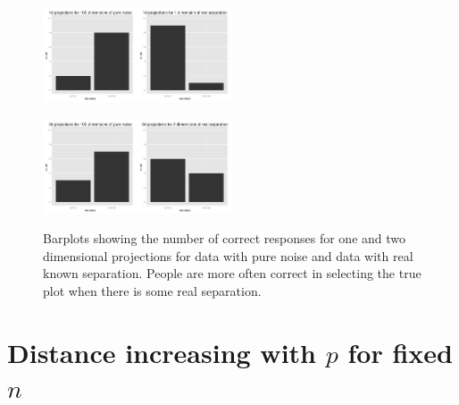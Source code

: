 \documentclass[12]{report}
\begin{document}
\begin{figure}[hbtp]
       \centerline{\includegraphics[width=0.25\textwidth]{result_1d_noise.pdf}\includegraphics[width=0.25\textwidth]{result_1d_sep.pdf}}
       \centerline{\includegraphics[width=0.25\textwidth]{result_2d_noise.pdf}\includegraphics[width=0.25\textwidth]{result_2d_sep.pdf}}
       \caption{Barplots showing the number of correct responses for one and two dimensional projections for data with pure noise and data with real known separation. People are more often correct in selecting the true plot when there is some real separation.  }
       \label{fig:result}
\end{figure}








\section{Distance increasing with $p$ for fixed $n$} \label{sec:distance}
\end{document}
